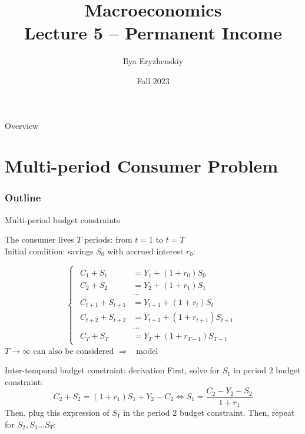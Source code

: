 \documentclass{beamer}
\title[PSME]{Macroeconomics\\ Lecture 5 -- Permanent Income}
\author[I. Eryzhenskiy]{Ilya Eryzhenskiy}
\institute[BdF]{PSME Panth\'{e}on-Sorbonne Master in Economics}
\date[PSME macro]{Fall 2023}
\newcommand{\tb}[1]{{\color{blue}{\textbf{#1}}}}
\newcommand{\rarr}{$\Rightarrow$\ }
\begin{document}
\begin{frame}
  \maketitle
\end{frame}

\begin{frame}{Overview}
  \tableofcontents
\end{frame}


\section{Multi-period Consumer Problem}
\begin{frame}
\frametitle{Outline}
\tableofcontents[currentsection]
\end{frame}
\begin{frame}{Multi-period budget constraints}

The consumer lives $T$ periods: from $t=1$ to $t=T$ \\ \vfill
Initial condition: savings $S_{0}$ with accrued interest $r_{0}$:

\begin{equation*}
\begin{cases}
\begin{aligned}
C_{1}+S_{1}&=Y_{1}+\left( 1+r_{0}\right) S_{0}\\
C_{2}+S_{2}&=Y_{2}+\left( 1+r_{1}\right) S_{1}\\
&\dots \\
C_{t+1}+S_{t+1}&=Y_{t+1}+\left( 1+r_{t}\right) S_{t}\\ 
C_{t+2} + S_{t+2} &= Y_{t+2} + (1+r_{t+1}) S_{t+1} \\
&\dots \\
C_{T}+S_{T}&=Y_{T}+( 1+r_{T-1}) S_{T-1}
\end{aligned}
\end{cases}
\end{equation*}
$T \to \infty$ can also be considered \rarr \tb{infinite-horizon} model
\end{frame}


\begin{frame}{Inter-temporal budget constraint: derivation}
\vspace{-3.5cm}
First, solve for $S_1$ in period $2$ budget constraint:
	\begin{equation*}
	C_2 + S_{2} = (1+r_1) S_1 + Y_{2} - C_{2} \Leftrightarrow 
	S_{1} = \frac{C_{2} - Y_{2} - S_{2}}{1+r_1}
\end{equation*}
Then, plug this expression of $S_1$ in the period $2$ budget constraint. Then, repeat for $S_{2}, S_{3} \dots S_{T}:$
	
\end{frame}
\end{document}
